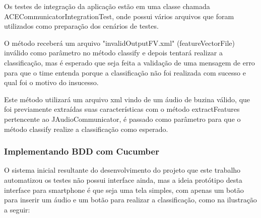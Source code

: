 \begin{itemize}
Os testes de integração da aplicação estão em uma classe chamada ACECommunicatorIntegrationTest, onde possui vários arquivos que foram utilizados como preparação dos cenários de testes.

O método receberá um arquivo "invalidOutputFV.xml" (featureVectorFile) inválido como parâmetro no método classify e depois tentará realizar a classificação, mas é esperado que seja feita a validação de uma mensagem de erro para que o time entenda porque a classificação não foi realizada com sucesso e qual foi o motivo do insucesso. 

Este método utilizará um arquivo xml vindo de um áudio de buzina válido, que foi previamente extraídas suas características com o método extractFeatures pertencente ao JAudioCommunicator, é passado como parâmetro para que o método classify realize a classificação como esperado.

\end{itemize}

\subsubsection{Implementando BDD com Cucumber}

O sistema inicial resultante do desenvolvimento do projeto que este trabalho automatizou os testes não possui interface ainda, mas a ideia protótipo desta interface para smartphone é que seja uma tela simples, com apenas um botão para inserir um áudio e um botão para realizar a classificação, como na ilustração a seguir:


